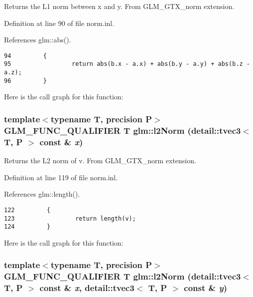 Returns the L1 norm between x and y. From GLM\_\-GTX\_\-norm extension. 

Definition at line 90 of file norm.inl.

References glm::abs().

\begin{Code}\begin{verbatim}94         {
95                 return abs(b.x - a.x) + abs(b.y - a.y) + abs(b.z - a.z);
96         }
\end{verbatim}
\end{Code}




Here is the call graph for this function:\hypertarget{group__gtx__norm_g17bb46915f9694cbae612a7bae4c5116}{
\subsubsection[l2Norm]{\setlength{\rightskip}{0pt plus 5cm}template$<$typename T, precision P$>$ GLM\_\-FUNC\_\-QUALIFIER T glm::l2Norm (detail::tvec3$<$ T, P $>$ const \& {\em x})}}
\label{group__gtx__norm_g17bb46915f9694cbae612a7bae4c5116}


Returns the L2 norm of v. From GLM\_\-GTX\_\-norm extension. 

Definition at line 119 of file norm.inl.

References glm::length().

\begin{Code}\begin{verbatim}122         {
123                 return length(v);
124         }
\end{verbatim}
\end{Code}




Here is the call graph for this function:\hypertarget{group__gtx__norm_g2c87568b2888f01baf0133320c09b8ca}{
\subsubsection[l2Norm]{\setlength{\rightskip}{0pt plus 5cm}template$<$typename T, precision P$>$ GLM\_\-FUNC\_\-QUALIFIER T glm::l2Norm (detail::tvec3$<$ T, P $>$ const \& {\em x}, \/  detail::tvec3$<$ T, P $>$ const \& {\em y})}}
\label{group__gtx__norm_g2c87568b2888f01baf0133320c09b8ca}


